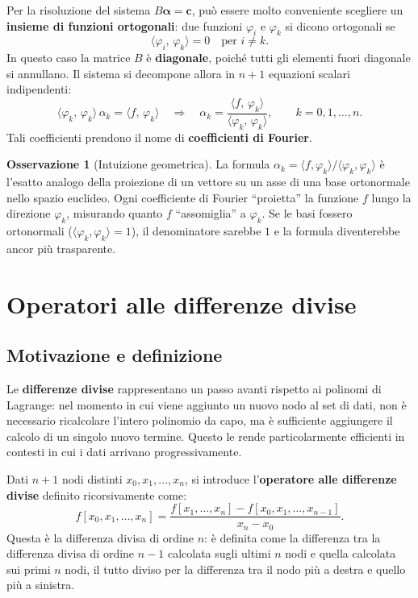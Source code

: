 \documentclass[a4paper,12pt]{article}
\theoremstyle{definition}
\newtheorem{osservazione}{Osservazione}[section]
\theoremstyle{remark}
\begin{document}
Per la risoluzione del sistema $B\boldsymbol{\alpha}=\mathbf{c}$, può
essere molto conveniente scegliere un \textbf{insieme di funzioni
ortogonali}: due funzioni $\varphi_i$ e $\varphi_k$ si dicono ortogonali
se
\[
  \langle \varphi_i,\,\varphi_k \rangle = 0 \quad \text{per } i \neq k.
\]
In questo caso la matrice $B$ è \textbf{diagonale}, poiché tutti gli
elementi fuori diagonale si annullano. Il sistema si decompone allora
in $n+1$ equazioni scalari indipendenti:
\[
  \langle \varphi_k,\,\varphi_k \rangle\,\alpha_k
  = \langle f,\,\varphi_k \rangle
  \quad\Longrightarrow\quad
  \alpha_k = \frac{\langle f,\,\varphi_k \rangle}{\langle \varphi_k,\,\varphi_k \rangle},
  \qquad k = 0,1,\ldots,n.
\]
Tali coefficienti prendono il nome di \textbf{coefficienti di Fourier}.

\begin{osservazione}[Intuizione geometrica]
La formula $\alpha_k = \langle f,\varphi_k\rangle / \langle\varphi_k,\varphi_k\rangle$
è l'esatto analogo della proiezione di un vettore su un asse di una base
ortonormale nello spazio euclideo. Ogni coefficiente di Fourier
``proietta'' la funzione $f$ lungo la direzione $\varphi_k$, misurando
quanto $f$ ``assomiglia'' a $\varphi_k$. Se le basi fossero ortonormali
($\langle\varphi_k,\varphi_k\rangle = 1$), il denominatore sarebbe $1$
e la formula diventerebbe ancor più trasparente.
\end{osservazione}

\section{Operatori alle differenze divise}

\subsection{Motivazione e definizione}

Le \textbf{differenze divise} rappresentano un passo avanti rispetto ai
polinomi di Lagrange: nel momento in cui viene aggiunto un nuovo nodo
al set di dati, non è necessario ricalcolare l'intero polinomio da capo,
ma è sufficiente aggiungere il calcolo di un singolo nuovo termine.
Questo le rende particolarmente efficienti in contesti in cui i dati
arrivano progressivamente.

Dati $n+1$ nodi distinti $x_0, x_1, \ldots, x_n$, si introduce
l'\textbf{operatore alle differenze divise} definito ricorsivamente come:
\[
  f[x_0, x_1, \ldots, x_n]
  = \frac{f[x_1, \ldots, x_n] - f[x_0, x_1, \ldots, x_{n-1}]}{x_n - x_0}.
\]
Questa è la differenza divisa di ordine $n$: è definita come la differenza
tra la differenza divisa di ordine $n-1$ calcolata sugli ultimi $n$ nodi
e quella calcolata sui primi $n$ nodi, il tutto diviso per la differenza
tra il nodo più a destra e quello più a sinistra.
\end{document}
